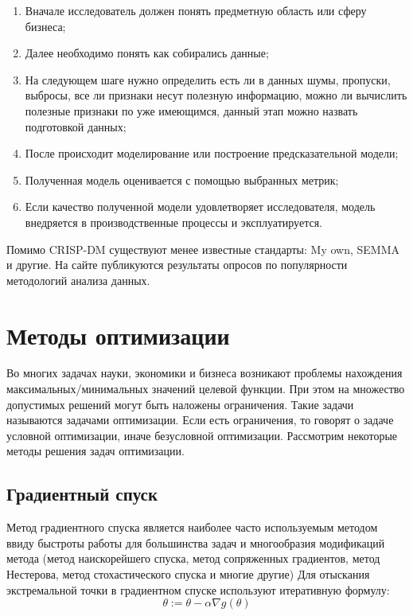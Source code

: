 \begin{enumerate}[label=\arabic*.]
    \item Вначале исследователь должен понять предметную область или сферу бизнеса;
    \item Далее необходимо понять как собирались данные;
    \item На следующем шаге нужно определить есть ли в данных шумы, пропуски, выбросы, все ли признаки несут полезную информацию, можно ли вычислить полезные признаки по уже имеющимся, данный этап можно назвать подготовкой данных;
    \item После происходит моделирование или построение предсказательной модели;
    \item Полученная модель оценивается с помощью выбранных метрик;
    \item Если качество полученной модели удовлетворяет исследователя, модель внедряется в производственные процессы и эксплуатируется.
\end{enumerate}
Помимо CRISP-DM существуют менее известные стандарты: My own, SEMMA и другие. На сайте \cite{poll:crisp_dm} публикуются результаты опросов по популярности методологий анализа данных.



\section{Методы оптимизации}

Во многих задачах науки, экономики и бизнеса возникают проблемы нахождения максимальных/минимальных значений целевой функции. При этом на множество допустимых решений могут быть наложены ограничения. Такие задачи называются задачами оптимизации. Если есть ограничения, то говорят о задаче условной оптимизации, иначе безусловной оптимизации. Рассмотрим некоторые методы решения задач оптимизации.


\subsection{Градиентный спуск}

Метод градиентного спуска является наиболее часто используемым методом ввиду быстроты работы для большинства задач и многообразия модификаций метода (метод наискорейшего спуска, метод сопряженных градиентов, метод Нестерова, метод стохастического спуска и многие другие)
Для отыскания экстремальной точки в градиентном спуске используют итеративную формулу:
$$ \theta := \theta - \alpha \nabla g(\theta) $$

